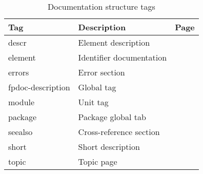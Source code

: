 \begin{table}[ht]
\caption{Documentation structure tags}\label{tab:structtags}
\begin{tabularx}{\textwidth}{lXr}
Tag & Description & Page \\ \hline
descr & Element description & \pageref{tag:descr} \\
element & Identifier documentation & \pageref{tag:element} \\
errors  & Error section & \pageref{tag:errors} \\
fpdoc-description & Global tag & \pageref{tag:fpdocdescription} \\
module & Unit tag & \pageref{tag:module} \\
package & Package global tab & \pageref{tag:package} \\
seealso & Cross-reference section & \pageref{tag:seealso} \\
short & Short description & \pageref{tag:short} \\ 
topic & Topic page & \pageref{tag:topic} \\ \hline
\end{tabularx}
\end{table}

